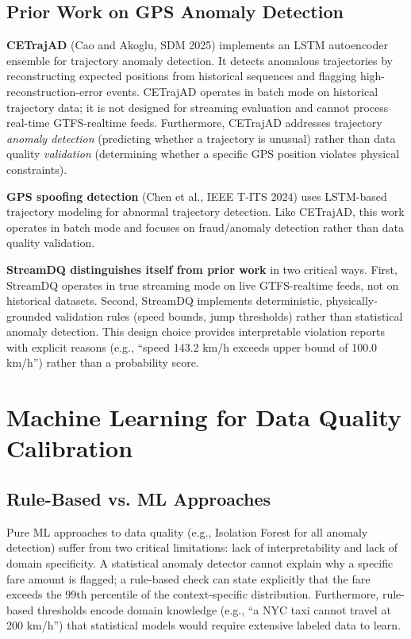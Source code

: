 \subsection{Prior Work on GPS Anomaly Detection}

\textbf{CETrajAD} \citep{cetrajad2025} (Cao and Akoglu, SDM 2025) implements
an LSTM autoencoder ensemble for trajectory anomaly detection. It detects
anomalous trajectories by reconstructing expected positions from historical
sequences and flagging high-reconstruction-error events. CETrajAD operates
in batch mode on historical trajectory data; it is not designed for
streaming evaluation and cannot process real-time GTFS-realtime feeds.
Furthermore, CETrajAD addresses trajectory \textit{anomaly detection}
(predicting whether a trajectory is unusual) rather than data quality
\textit{validation} (determining whether a specific GPS position violates
physical constraints).

\textbf{GPS spoofing detection} (Chen et al., IEEE T-ITS 2024)
\citep{gpsspoof2024} uses LSTM-based trajectory modeling for abnormal
trajectory detection. Like CETrajAD, this work operates in batch mode
and focuses on fraud/anomaly detection rather than data quality validation.

\textbf{StreamDQ distinguishes itself from prior work} in two critical
ways. First, StreamDQ operates in true streaming mode on live GTFS-realtime
feeds, not on historical datasets. Second, StreamDQ implements deterministic,
physically-grounded validation rules (speed bounds, jump thresholds) rather
than statistical anomaly detection. This design choice provides
interpretable violation reports with explicit reasons (e.g., ``speed
143.2 km/h exceeds upper bound of 100.0 km/h'') rather than a probability
score.

\section{Machine Learning for Data Quality Calibration}
\label{sec:ml-calibration}

\subsection{Rule-Based vs. ML Approaches}

Pure ML approaches to data quality (e.g., Isolation Forest for all anomaly
detection) suffer from two critical limitations: lack of interpretability
and lack of domain specificity. A statistical anomaly detector cannot explain
why a specific fare amount is flagged; a rule-based check can state explicitly
that the fare exceeds the 99th percentile of the context-specific distribution.
Furthermore, rule-based thresholds encode domain knowledge (e.g., ``a NYC
taxi cannot travel at 200 km/h'') that statistical models would require
extensive labeled data to learn.

